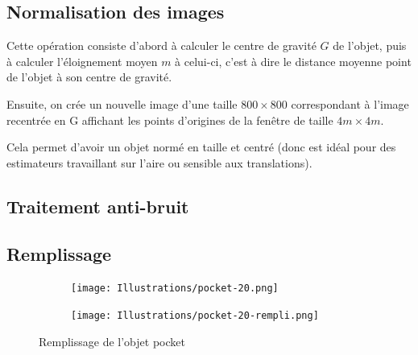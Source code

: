 \documentclass{article}
\begin{document}
    \subsection{Normalisation des images}     %
    
    Cette opération consiste d'abord à calculer le centre de gravité $G$ de l'objet, puis à calculer l'éloignement moyen $m$ à celui-ci, c'est à dire le distance moyenne point de l'objet à son centre de gravité.
    
    Ensuite, on crée un nouvelle image d'une taille $800 \times 800$ correspondant à l'image recentrée en G affichant les points d'origines de la fenêtre de taille $4m \times 4m$.
    
    Cela permet d'avoir un objet normé en taille et centré (donc est idéal pour des estimateurs travaillant sur l'aire ou sensible aux translations).
      
    \subsection{Traitement anti-bruit}
    
    \subsection{Remplissage}
    
      \begin{figure}[!h]
	\centering
	\begin{subfigure}{.25\textwidth}
	  \centering
	  \texttt{[image: Illustrations/pocket-20.png]}
	  \label{pocket-non-rempli}
	\end{subfigure}
	\begin{subfigure}{.25\textwidth}
	  \centering
	  \texttt{[image: Illustrations/pocket-20-rempli.png]}
	\label{pocket-rempli}
	\end{subfigure}
	\caption{Remplissage de l'objet pocket}
	\label{remplissage}
      \end{figure}
      
\end{document}
